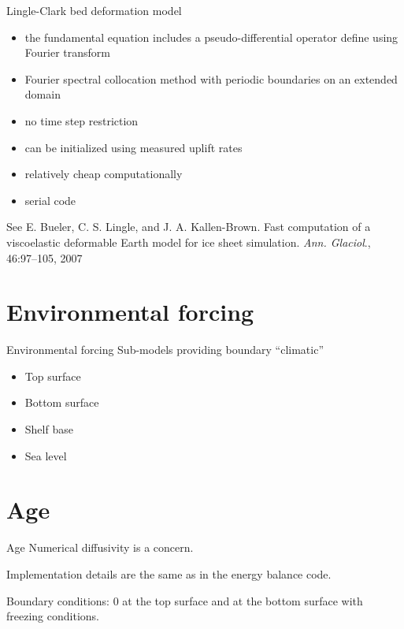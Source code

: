 \documentclass[hide notes,intlimits]{beamer}
\begin{document}
\begin{frame}{Lingle-Clark bed deformation model}
  \begin{itemize}
  \item the fundamental equation includes a pseudo-differential
    operator define using Fourier transform
  \item Fourier spectral collocation method with periodic boundaries
    on an extended domain
  \item no time step restriction
  \item can be initialized using measured uplift rates
  \item relatively cheap computationally
  \item serial code
  \end{itemize}

  See E. Bueler, C. S. Lingle, and J. A. Kallen-Brown. Fast
  computation of a viscoelastic deformable Earth model for ice sheet
  simulation. \emph{Ann. Glaciol}., 46:97–105, 2007
\end{frame}

\section{Environmental forcing}
\label{sec:environment}

\begin{frame}{Environmental forcing}
  Sub-models providing boundary ``climatic''

  \begin{itemize}
  \item Top surface
  \item Bottom surface
  \item Shelf base
  \item Sea level
  \end{itemize}
\end{frame}


\section{Age}
\label{sec:age}

\begin{frame}{Age}
  Numerical diffusivity is a concern.

  Implementation details are the same as in the energy balance code.

  Boundary conditions: 0 at the top surface and at the bottom surface
  with freezing conditions.
\end{frame}
\end{document}
